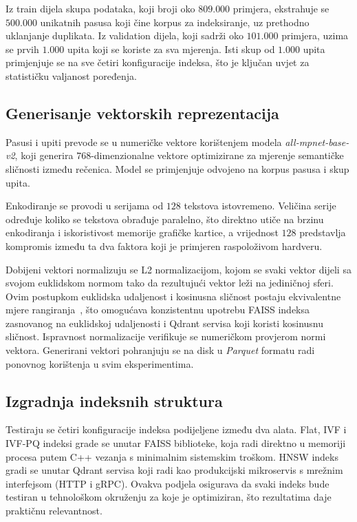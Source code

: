 Iz train dijela skupa podataka, koji broji oko $809{.}000$ primjera,
ekstrahuje se $500{.}000$ unikatnih pasusa koji čine korpus za indeksiranje,
uz prethodno uklanjanje duplikata. Iz validation
dijela, koji sadrži oko $101{.}000$ primjera, uzima se prvih $1{.}000$
upita koji se koriste za sva mjerenja. Isti skup od $1{.}000$
upita primjenjuje se na sve četiri konfiguracije indeksa, što je ključan
uvjet za statističku valjanost poređenja.

\subsection{Generisanje vektorskih reprezentacija}
\label{sec:embeddings}

Pasusi i upiti prevode se u numeričke vektore korištenjem modela
\foreignlanguage{english}{\emph{all-mpnet-base-v2}},
koji generira $768$-dimenzionalne vektore optimizirane za mjerenje semantičke
sličnosti između rečenica. Model se primjenjuje odvojeno na korpus pasusa
i skup upita.

Enkodiranje se provodi u serijama od $128$ tekstova istovremeno. Veličina
serije određuje koliko se tekstova obrađuje paralelno, što direktno utiče
na brzinu enkodiranja i iskoristivost memorije grafičke kartice, a vrijednost
$128$ predstavlja kompromis između ta dva faktora koji je primjeren raspoloživom
hardveru.

Dobijeni vektori normalizuju se L2 normalizacijom, kojom se svaki vektor
dijeli sa svojom euklidskom normom tako da rezultujući vektor leži na
jediničnoj sferi. Ovim postupkom euklidska udaljenost i kosinusna sličnost
postaju ekvivalentne mjere rangiranja~\cite{manning2008introduction}, što
omogućava konzistentnu upotrebu \foreignlanguage{english}{FAISS} indeksa
zasnovanog na euklidskoj udaljenosti i \foreignlanguage{english}{Qdrant}
servisa koji koristi kosinusnu sličnost. Ispravnost normalizacije verifikuje
se numeričkom provjerom normi vektora. Generirani vektori pohranjuju se na
disk u \foreignlanguage{english}{\emph{Parquet}} formatu radi
ponovnog korištenja u svim eksperimentima.

\subsection{Izgradnja indeksnih struktura}
\label{sec:indeksi}

Testiraju se četiri konfiguracije indeksa podijeljene između dva alata.
\foreignlanguage{english}{Flat}, \foreignlanguage{english}{IVF} i
\foreignlanguage{english}{IVF-PQ} indeksi grade se unutar
\foreignlanguage{english}{FAISS} biblioteke, koja
radi direktno u memoriji procesa putem C++ vezanja s minimalnim sistemskim
troškom. \foreignlanguage{english}{HNSW} indeks gradi se unutar
\foreignlanguage{english}{Qdrant} servisa koji radi kao produkcijski
mikroservis s mrežnim interfejsom (\foreignlanguage{english}{HTTP} i
\foreignlanguage{english}{gRPC}). Ovakva podjela osigurava da svaki indeks
bude testiran u tehnološkom okruženju za koje je optimiziran, što rezultatima
daje praktičnu relevantnost.

